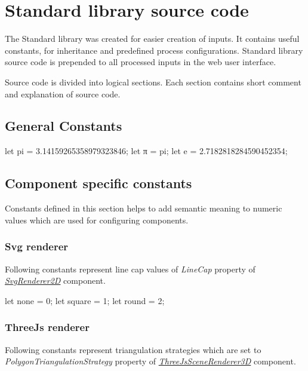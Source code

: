 
\chapter{Standard library source code}
\label{chap:stdLib}

The Standard library was created for easier creation of inputs.
It contains useful constants, \lsystems for inheritance and predefined process configurations.
Standard library source code is prepended to all processed inputs in the web user interface.

Source code is divided into logical sections.
Each section contains short comment and explanation of source code.


\section{General Constants}

\begin{LsystemBreak}
let pi = 3.14159265358979323846;
let π = pi;
let e = 2.7182818284590452354;
\end{LsystemBreak}


\section{Component specific constants}

Constants defined in this section helps to add semantic meaning to numeric values which are used for configuring components.

\subsection{Svg renderer}
\label{sec:stdLibSvgRenderer}

Following constants represent line cap values of \emph{LineCap} property of \hyperref[Malsys.Processing.Components.Renderers.SvgRenderer2D]{\emph{SvgRenderer2D}} component.

\begin{LsystemBreak}
let none = 0;
let square = 1;
let round = 2;
\end{LsystemBreak}


\subsection{ThreeJs renderer}
\label{sec:stdLibThreeJs}

Following constants represent triangulation strategies which are set to \emph{PolygonTriangulationStrategy} property of \hyperref[Malsys.Processing.Components.Renderers.ThreeJsSceneRenderer3D]{\emph{ThreeJsSceneRenderer3D}} component.

